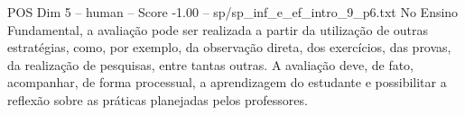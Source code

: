 \begin{textsample}{POS Dim 5 – human – Score -1.00 – sp/sp\_inf\_e\_ef\_intro\_9\_p6.txt}  \label{ex:f5_pos_005}
No Ensino Fundamental, a avaliação pode ser realizada a partir da utilização de outras estratégias, como, por exemplo, da observação direta, dos exercícios, das provas, da realização de pesquisas, entre tantas outras.
A avaliação deve, de fato, acompanhar, de forma processual, a aprendizagem do estudante e possibilitar a reflexão sobre as práticas planejadas pelos professores.

\end{textsample}
